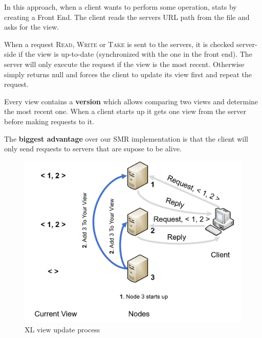 \documentclass[times, 10pt,twocolumn]{article}
\begin{document}


In this approach, when a client wants to perform some operation, stats by creating
a Front End. The client reads the servers URL path from the file and asks for
the view.

When a request \textsc{Read}, \textsc{Write} or \textsc{Take} is sent to the servers,
it is checked server-side if the view is up-to-date (synchronized with the one 
in the front end).
The server will only execute the request if the view is the most recent. Otherwise
simply returns null and forces the client to update its view first and repeat the
request.

Every view contains a \textbf{version} which allows comparing two views and determine the
most recent one. When a client starts up it gets one view from the server before
making requests to it.

The \textbf{biggest advantage} over our SMR implementation is that the client will only
send requests to servers that are supose to be alive.

 


\begin{figure}
   \includegraphics[width=\linewidth]{xl_join1.png}
   \caption{XL view update process}
   \label{fig:xl_join1}
 \end{figure}
\end{document}
